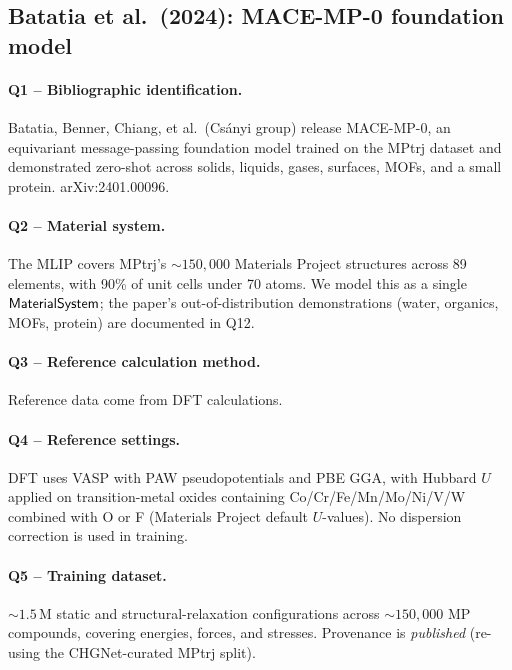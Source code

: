 \subsection{Batatia et al.\ (2024): MACE-MP-0 foundation model}
\label{sec:appendix-example-batatia2024mp0}

\paragraph{Q1 -- Bibliographic identification.}
Batatia, Benner, Chiang, et al.\ (Cs\'anyi group) release MACE-MP-0,
an equivariant message-passing foundation model trained on the MPtrj
dataset and demonstrated zero-shot across solids, liquids, gases,
surfaces, MOFs, and a small protein. arXiv:2401.00096.


\paragraph{Q2 -- Material system.}
The MLIP covers MPtrj's ${\sim}150{,}000$ Materials Project structures
across 89 elements, with 90\% of unit cells under 70 atoms. We model
this as a single $\mathsf{MaterialSystem}$; the paper's out-of-distribution
demonstrations (water, organics, MOFs, protein) are documented in
Q12.


\paragraph{Q3 -- Reference calculation method.}
Reference data come from DFT calculations.


\paragraph{Q4 -- Reference settings.}
DFT uses VASP with PAW pseudopotentials and PBE GGA, with Hubbard $U$
applied on transition-metal oxides containing Co/Cr/Fe/Mn/Mo/Ni/V/W
combined with O or F (Materials Project default $U$-values). No
dispersion correction is used in training.


\paragraph{Q5 -- Training dataset.}
${\sim}1.5$\,M static and structural-relaxation configurations across
${\sim}150{,}000$ MP compounds, covering energies, forces, and
stresses. Provenance is \emph{published} (re-using the CHGNet-curated
MPtrj split).



